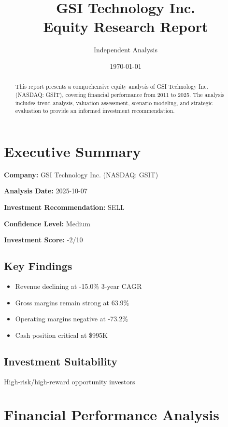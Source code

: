 \documentclass[11pt,a4paper]{article}
\title{GSI Technology Inc. \\ Equity Research Report}
\author{Independent Analysis}
\date{\today}
\begin{document}
\maketitle
\thispagestyle{empty}

\begin{abstract}
This report presents a comprehensive equity analysis of GSI Technology Inc. (NASDAQ: GSIT), 
covering financial performance from 2011 to 2025. The analysis includes trend analysis, 
valuation assessment, scenario modeling, and strategic evaluation to provide an informed 
investment recommendation.
\end{abstract}

\newpage

\tableofcontents

\newpage

\section{Executive Summary}

\textbf{Company:} GSI Technology Inc. (NASDAQ: GSIT)

\textbf{Analysis Date:} 2025-10-07

\textbf{Investment Recommendation:} SELL

\textbf{Confidence Level:} Medium

\textbf{Investment Score:} -2/10

\subsection{Key Findings}

\begin{itemize}
\item Revenue declining at -15.0\% 3-year CAGR
\item Gross margins remain strong at 63.9\%
\item Operating margins negative at -73.2\%
\item Cash position critical at \$995K
\end{itemize}

\subsection{Investment Suitability}

High-risk/high-reward opportunity investors


\newpage

\section{Financial Performance Analysis}
\end{document}
